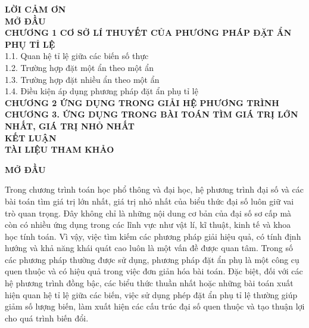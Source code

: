\documentclass[12pt]{report}
\begin{document}
\vspace{0.5cm}


\noindent \textbf{LỜI CẢM ƠN}  \\
\noindent \textbf{MỞ ĐẦU}  \\
\noindent \textbf{CHƯƠNG 1 CƠ SỞ LÍ THUYẾT CỦA PHƯƠNG PHÁP ĐẶT ẨN PHỤ TỈ LỆ}  \\
\hspace*{0.5cm} 1.1. Quan hệ tỉ lệ giữa các biến số thực  \\
\hspace*{0.5cm} 1.2. Trường hợp đặt một ẩn theo một ẩn  \\
\hspace*{0.5cm} 1.3. Trường hợp đặt nhiều ẩn theo một ẩn  \\
\hspace*{0.5cm} 1.4. Điều kiện áp dụng phương pháp đặt ẩn phụ tỉ lệ  \\
\noindent \textbf{CHƯƠNG 2 ỨNG DỤNG TRONG GIẢI HỆ PHƯƠNG TRÌNH}  \\
\noindent \textbf{CHƯƠNG 3. ỨNG DỤNG TRONG BÀI TOÁN TÌM GIÁ TRỊ LỚN NHẤT, GIÁ TRỊ NHỎ NHẤT}  \\
\noindent \textbf{KẾT LUẬN}  \\
\noindent \textbf{TÀI LIỆU THAM KHẢO} 
\newpage
\begin{center}
    \textbf{\Large MỞ ĐẦU}
\end{center}

\vspace{0.5cm}

\noindent Trong chương trình toán học phổ thông và đại học, hệ phương trình đại số và các bài toán tìm giá trị lớn nhất, giá trị nhỏ nhất của biểu thức đại số luôn giữ vai trò quan trọng. Đây không chỉ là những nội dung cơ bản của đại số sơ cấp mà còn có nhiều ứng dụng trong các lĩnh vực như vật lí, kĩ thuật, kinh tế và khoa học tính toán. Vì vậy, việc tìm kiếm các phương pháp giải hiệu quả, có tính định hướng và khả năng khái quát cao luôn là một vấn đề được quan tâm. Trong số các phương pháp thường được sử dụng, phương pháp đặt ẩn phụ là một công cụ quen thuộc và có hiệu quả trong việc đơn giản hóa bài toán. Đặc biệt, đối với các hệ phương trình đồng bậc, các biểu thức thuần nhất hoặc những bài toán xuất hiện quan hệ tỉ lệ giữa các biến, việc sử dụng phép đặt ẩn phụ tỉ lệ thường giúp giảm số lượng biến, làm xuất hiện các cấu trúc đại số quen thuộc và tạo thuận lợi cho quá trình biến đổi.
\end{document}
